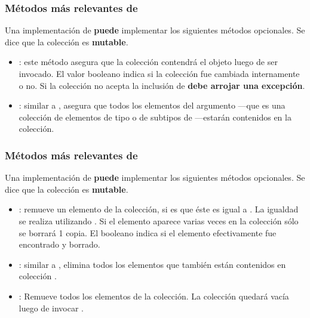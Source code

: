 \documentclass{beamer}
\begin{document}
\begin{frame}[fragile]
  \frametitle{Métodos más relevantes de }

  Una implementación de  \textbf{puede}
  implementar los siguientes métodos opcionales. Se dice que la colección es
  \textbf{mutable}.

  \begin{itemize}
    
  \item {}: este método asegura que la colección
    contendrá el objeto  luego de ser invocado. El valor
    booleano indica si la colección fue cambiada internamente o no. Si
    la colección no acepta la inclusión de  \textbf{debe
      arrojar una excepción}.
    
  \item {}: similar a
    , asegura que todos los elementos del argumento
    ---que es una colección de elementos de tipo  o
    de subtipos de ---estarán contenidos en la colección.
   
  \end{itemize}
  
\end{frame}

\begin{frame}[fragile]
  \frametitle{Métodos más relevantes de }

  Una implementación de  \textbf{puede}
  implementar los siguientes métodos opcionales. Se dice que la colección es
  \textbf{mutable}.

  \begin{itemize}
    
  \item {}: remueve un elemento de la
    colección, si es que éste es igual a . La igualdad se
    realiza utilizando . Si el elemento aparece varias
    veces en la colección sólo se borrará 1 copia. El booleano indica
    si el elemento efectivamente fue encontrado y borrado.
    
  \item {}: similar a
    , elimina todos los elementos que también están
    contenidos en colección .
    
  \item {}: Remueve todos los elementos de la
    colección. La colección quedará vacía luego de invocar
    .
   
  \end{itemize}
  
\end{frame}
\end{document}
